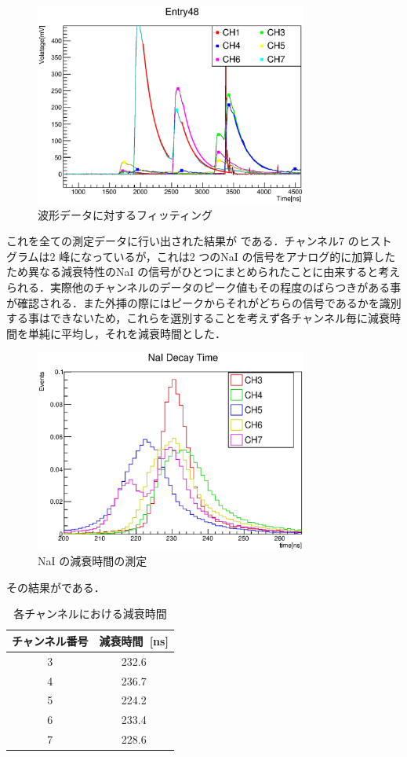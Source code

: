 \begin{figure}[hbt]
\centering
\includegraphics[width=0.8\textwidth]{figure/hatano/decayfit.eps}
\caption{波形データに対するフィッティング}
\label{hatano_fig:decayfit}
\end{figure}

これを全ての測定データに行い出された結果が である．チャンネル7 のヒストグラムは2 峰になっているが，これは2 つのNaI の信号をアナログ的に加算したため異なる減衰特性のNaI の信号がひとつにまとめられたことに由来すると考えられる．実際他のチャンネルのデータのピーク値もその程度のばらつきがある事が確認される．また外挿の際にはピークからそれがどちらの信号であるかを識別する事はできないため，これらを選別することを考えず各チャンネル毎に減衰時間を単純に平均し，それを減衰時間とした．
\begin{figure}[hbt]
\centering
\includegraphics[width=0.8\textwidth]{figure/hatano/decaytime.eps}
\caption{NaI の減衰時間の測定}
\label{hatano_fig:decaytime}
\end{figure}
その結果がである．
\begin{table}[hbt]
\centering
\caption{各チャンネルにおける減衰時間}
\begin{tabular}{cc}\\ \toprule
チャンネル番号 & 減衰時間~[ns]\\ \midrule
3 & 232.6 \\
4 & 236.7 \\
5 & 224.2 \\
6 & 233.4 \\
7 & 228.6 \\ \bottomrule
\end{tabular}
\label{hatano_tab:decaytime}
\end{table}

